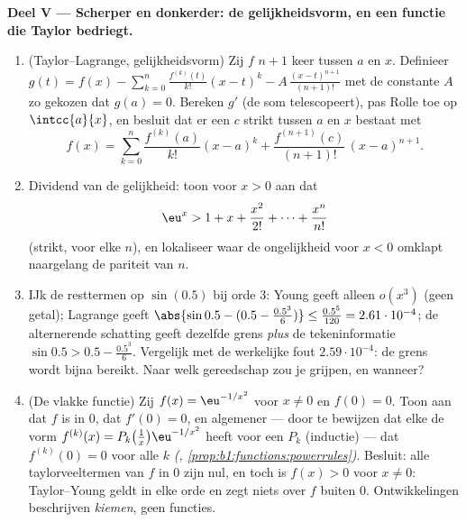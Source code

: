 \begin{problem}
\medskip
\noindent\textbf{Deel V --- Scherper en donkerder: de
gelijkheidsvorm, en een functie die Taylor bedriegt.}
\begin{enumerate}[resume]
  \item (Taylor--Lagrange, gelijkheidsvorm) Zij $f$ $n + 1$ keer
         tussen $a$ en $x$. Definieer $g(t) = f(x) -
        \sum_{k=0}^{n} \frac{f^{(k)}(t)}{k!}(x - t)^k -
        A\,\frac{(x-t)^{n+1}}{(n+1)!}$ met de constante $A$ zo
        gekozen dat $g(a) = 0$. Bereken $g'$ (de som
        telescopeert), pas Rolle toe op $\intcc{a}{x}$, en besluit
        dat er een $c$ strikt tussen $a$ en $x$ bestaat met
        \[
        f(x) = \sum_{k=0}^{n} \frac{f^{(k)}(a)}{k!}(x-a)^k
        + \frac{f^{(n+1)}(c)}{(n+1)!}\,(x-a)^{n+1} .
        \]
  \item Dividend van de gelijkheid: toon voor $x > 0$ aan dat
        \[
        \eu^x > 1 + x + \frac{x^2}{2!} + \dots +
        \frac{x^n}{n!}
        \]
        (strikt, voor elke $n$), en lokaliseer waar de
        ongelijkheid voor $x < 0$ omklapt naargelang de pariteit
        van $n$.
  \item IJk de resttermen op $\sin(0.5)$ bij orde $3$: Young
        geeft alleen $o(x^3)$ (geen getal); Lagrange geeft
        $\abs{\sin 0.5 - (0.5 - \frac{0.5^3}{6})} \leq
        \frac{0.5^5}{120} = 2.61\cdot10^{-4}$; de alternerende
        schatting geeft dezelfde grens \emph{plus} de
        tekeninformatie $\sin 0.5 > 0.5 - \frac{0.5^3}{6}$.
        Vergelijk met de werkelijke fout $2.59\cdot10^{-4}$: de
        grens wordt bijna bereikt. Naar welk gereedschap zou je
        grijpen, en wanneer?
  \item (De vlakke functie) Zij $f(x) = \eu^{-1/x^2}$ voor $x
        \neq 0$ en $f(0) = 0$. Toon aan dat $f$  is in $0$,
        dat $f'(0) = 0$, en algemener --- door te bewijzen dat
        elke  de vorm $f^{(k)}(x) =
        P_k\bigl(\frac1x\bigr)\eu^{-1/x^2}$ heeft voor een
         $P_k$ (inductie) --- dat $f^{(k)}(0) = 0$ voor
        alle $k$ \emph{(,
        \cref{prop:b1:functions:powerrules})}. Besluit: alle
        taylorveeltermen van $f$ in $0$ zijn nul, en toch is $f(x)
        > 0$ voor $x \neq 0$: Taylor--Young geldt in elke orde en
        zegt niets over $f$ buiten $0$. Ontwikkelingen beschrijven
        \emph{kiemen}, geen functies.
\end{enumerate}


\end{problem}
